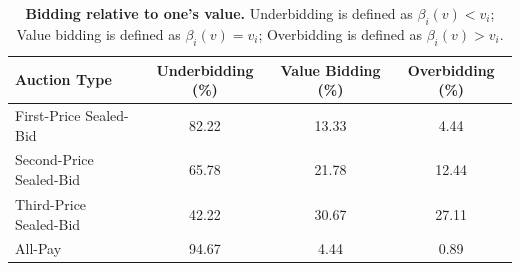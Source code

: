 \documentclass{article} %
\begin{document}

\begin{table}[h]
\centering
\renewcommand{\arraystretch}{1.4}

\begin{tabular}{lccc}
\hline
\textbf{Auction Type} & \textbf{Underbidding (\%)} & \textbf{Value Bidding (\%)} & \textbf{Overbidding (\%)} \\
\hline
First-Price Sealed-Bid  & 82.22  & 13.33  & 4.44  \\
Second-Price Sealed-Bid  & 65.78  & 21.78  & 12.44 \\
Third-Price Sealed-Bid  & 42.22  & 30.67  & 27.11 \\
All-Pay & 94.67  & 4.44   & 0.89  \\
\hline
\end{tabular}
\caption{\textbf{Bidding relative to one's value.} Underbidding is defined as $\beta_i(v) < v_i$; Value bidding is defined as $\beta_i(v) = v_i$; Overbidding is defined as $\beta_i(v) > v_i$.\label{tab:bidding_errors}}
\end{table}
\end{document}
